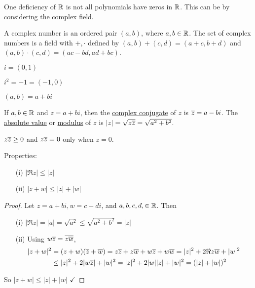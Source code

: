 \documentclass[]{article}
\begin{document}
One deficiency of $\mathbb{R}$ is not all polynomials have zeros in $\mathbb{R}$.
This can be  by considering the complex field.

\begin{definition}
	A complex number is an ordered pair $(a,b)$, where $a,b\in\mathbb{R}$.
	The set of complex numbers is a field with $+,\cdot$ defined by $(a,b)+(c,d)=(a+c,b+d)$ and $(a,b)\cdot(c,d)=(ac-bd,ad+bc)$.
\end{definition}
\begin{definition}
	$i=(0,1)$
\end{definition}
\begin{theorem}
	$i^2=-1=(-1,0)$
\end{theorem}
\begin{theorem}
	$(a,b)=a+bi$
\end{theorem}

\begin{definition}
	If $a,b\in\mathbb{R}$ and $z=a+bi$, then the \ul{complex conjugate} of $z$ is $\overline{z}=a-bi$. The \ul{absolute value} or \ul{modulus} of $z$ is $|z|=\sqrt{z\overline{z}}=\sqrt{a^2+b^2}$.
\end{definition}
\begin{note}
	$z\overline{z} \geq0$ and $z\overline{z}=0$ only when $z=0$.
\end{note}
\begin{proposition}
	Properties:
	\begin{enumerate}
		\item[(i)] $|\Re z|\leq|z|$
		\item[(ii)] $|z+w|\leq|z|+|w|$
	\end{enumerate}
\end{proposition}
\begin{proof}
	Let $z=a+bi,w=c+di$, and $a,b,c,d,\in\mathbb{R}$. Then
	\begin{enumerate}
		\item[(i)] $|\Re z|=|a|=\sqrt{a^2}\leq\sqrt{a^2+b^2}=|z|$
	\item[(ii)] Using $w\overline{z} = \overline{z\overline{w}}$,
		\begin{align*}
			|z+w|^2 &= (z+w)(\overline{z}+\overline{w})=z\overline{z}+z\overline{w}+w\overline{z}+w\overline{w} = |z|^2+2\Re z\overline{w}+|w|^2 \\
					&\leq |z|^2+2|w\overline{z}|+|w|^2 = |z|^2+2|w||z|+|w|^2 = (|z|+|w|)^2
		\end{align*}
	\end{enumerate}
	So $|z+w|\leq|z|+|w|$ $\checkmark$
\end{proof}
\end{document}
